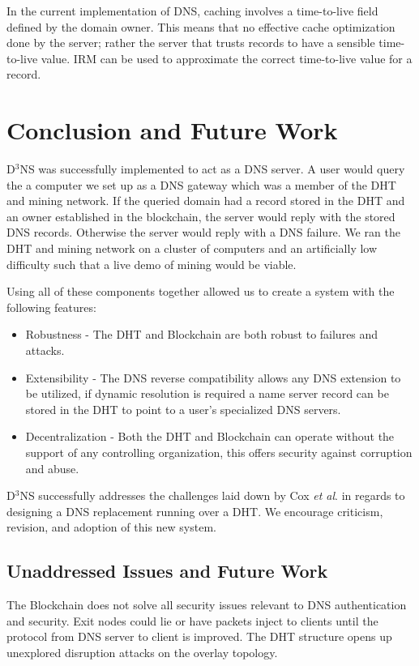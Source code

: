 \documentclass[11pt]{IEEEtran} %
\begin{document}
In the current implementation of DNS, caching involves a time-to-live field defined by the domain owner. This means that no effective cache optimization done by the server; rather the server that trusts records to have a sensible time-to-live value. IRM \cite{irm} can be used to approximate the correct time-to-live value for a record.

\section{Conclusion and Future Work}
D$^3$NS was successfully implemented to act as a DNS server.  A user would query the a computer we set up as a DNS gateway which was a member of the DHT and mining network. If the queried domain had a record stored in the DHT and an owner established in the blockchain, the server would reply with the stored DNS records. Otherwise the server would reply with a DNS failure. We ran the DHT and mining network on a cluster of computers and an artificially low difficulty such that a live demo of mining would be viable.

Using all of these components together allowed us to create a system with the following features:
\begin{itemize}
	\item Robustness - The DHT and Blockchain are both robust to failures and attacks.
	\item Extensibility - The DNS reverse compatibility allows any DNS extension to be utilized, if dynamic resolution is required a name server record can be stored in the DHT to point to a user's specialized DNS servers.
	\item Decentralization - Both the DHT and Blockchain can operate without the support of any controlling organization, this offers security against corruption and abuse. 
\end{itemize}	

D$^3$NS successfully addresses the challenges laid down by Cox \textit{et al}. \cite{cox}  in regards to designing a DNS replacement running over a DHT.   We encourage criticism, revision, and adoption of this new system.

\subsection{Unaddressed Issues and Future Work}
The Blockchain does not solve all security issues relevant to DNS authentication and security. Exit nodes could lie or have packets inject to clients until the protocol from DNS server to client is improved. The DHT structure opens up unexplored disruption attacks on the overlay topology.
\end{document}
